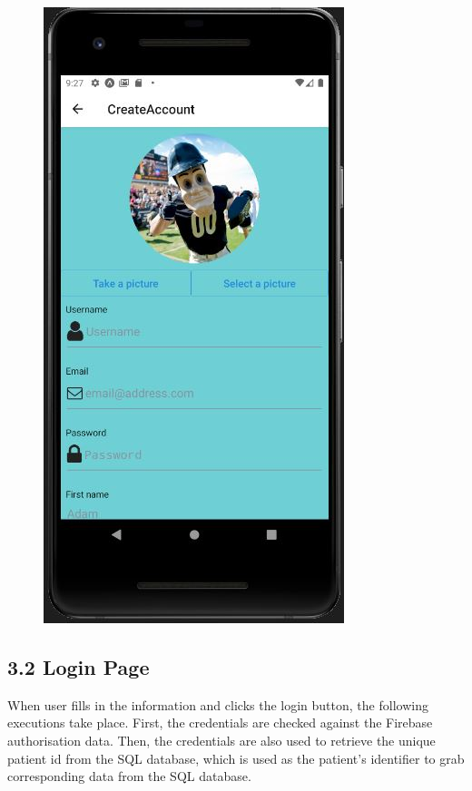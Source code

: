 \documentclass[]{book}
\begin{document}
\begin{figure}
\centering
\includegraphics{./phone_app_doc_images/create_account_page.JPG}
\caption{}
\end{figure}

\subsection{3.2 Login Page}\label{login-page}

When user fills in the information and clicks the login button, the
following executions take place. First, the credentials are checked
against the Firebase authorisation data. Then, the credentials are also
used to retrieve the unique patient id from the SQL database, which is
used as the patient's identifier to grab corresponding data from the SQL
database.
\end{document}
